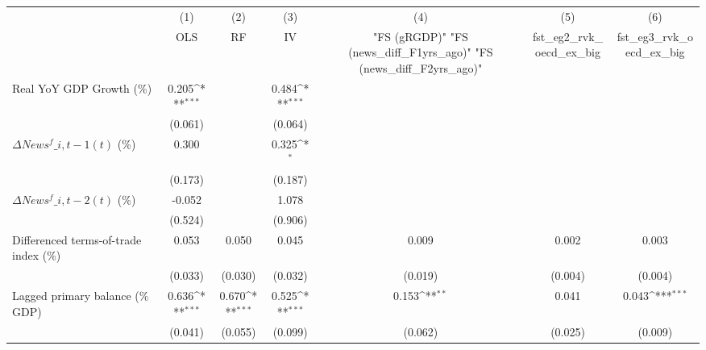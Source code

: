 {
\def\sym#1{\ifmmode^{#1}\else\(^{#1}\)\fi}
\begin{tabular}{l*{6}{c}}
\toprule
                    &\multicolumn{1}{c}{(1)}&\multicolumn{1}{c}{(2)}&\multicolumn{1}{c}{(3)}&\multicolumn{1}{c}{(4)}&\multicolumn{1}{c}{(5)}&\multicolumn{1}{c}{(6)}\\
                    &\multicolumn{1}{c}{OLS}&\multicolumn{1}{c}{RF}&\multicolumn{1}{c}{IV}&\multicolumn{1}{c}{ "FS (gRGDP)"  "FS (news\_diff\_F1yrs\_ago)"  "FS (news\_diff\_F2yrs\_ago)" }&\multicolumn{1}{c}{fst\_eg2\_rvk\_oecd\_ex\_big}&\multicolumn{1}{c}{fst\_eg3\_rvk\_oecd\_ex\_big}\\
\midrule
Real YoY GDP Growth (\%)&       0.205\sym{***}&                     &       0.484\sym{***}&                     &                     &                     \\
                    &     (0.061)         &                     &     (0.064)         &                     &                     &                     \\
\addlinespace
$ \Delta News^f\_{i,t-1}(t)$ (\%)&       0.300         &                     &       0.325\sym{*}  &                     &                     &                     \\
                    &     (0.173)         &                     &     (0.187)         &                     &                     &                     \\
\addlinespace
$ \Delta News^f\_{i,t-2}(t)$ (\%)&      -0.052         &                     &       1.078         &                     &                     &                     \\
                    &     (0.524)         &                     &     (0.906)         &                     &                     &                     \\
\addlinespace
Differenced terms-of-trade index (\%)&       0.053         &       0.050         &       0.045         &       0.009         &       0.002         &       0.003         \\
                    &     (0.033)         &     (0.030)         &     (0.032)         &     (0.019)         &     (0.004)         &     (0.004)         \\
\addlinespace
Lagged primary balance (\% GDP)&       0.636\sym{***}&       0.670\sym{***}&       0.525\sym{***}&       0.153\sym{**} &       0.041         &       0.043\sym{***}\\
                    &     (0.041)         &     (0.055)         &     (0.099)         &     (0.062)         &     (0.025)         &     (0.009)         \\

\end{tabular}}
